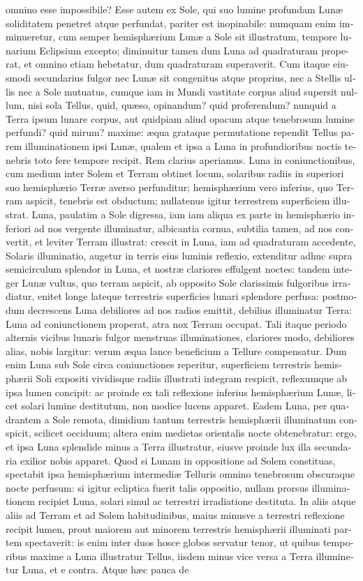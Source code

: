 \documentclass[11pt,twoside,openany]{book}
\begin{document}
\begin{otherlanguage}{latin}
omnino esse impossibile? Esse autem ex Sole, qui suo lumine profundam Lunæ soliditatem penetret atque perfundat, pariter est inopinabile: numquam enim imminueretur, cum semper hemisphærium Lunæ a Sole sit illustratum, tempore lunarium Eclipsium excepto; diminuitur tamen dum Luna ad quadraturam properat, et omnino etiam hebetatur, dum quadraturam superaverit. Cum itaque eiusmodi secundarius fulgor nec Lunæ sit congenitus atque proprius, nec a Stellis ullis nec a Sole mutuatus, cumque iam in Mundi vastitate corpus aliud supersit nullum, nisi sola Tellus, quid, quæso, opinandum? quid proferendum? nunquid a Terra ipsum lunare corpus, aut quidpiam aliud opacum atque tenebrosum lumine perfundi? quid mirum? maxime: æqua grataque permutatione rependit Tellus parem illuminationem ipsi Lunæ, qualem et ipsa a Luna in profundioribus noctis tenebris toto fere tempore recipit. Rem clarius aperiamus. Luna in coniunctionibus, cum medium inter Solem et Terram obtinet locum, solaribus radiis in superiori suo hemisphærio Terræ averso perfunditur; hemisphærium vero inferius, quo Terram aspicit, tenebris est obductum; nullatenus igitur terrestrem superficiem illustrat. Luna, paulatim a Sole digressa, iam iam aliqua ex parte in hemisphærio inferiori ad nos vergente illuminatur, albicantia cornua, subtilia tamen, ad nos convertit, et leviter Terram illustrat: crescit in Luna, iam ad quadraturam accedente, Solaris illuminatio, augetur in terris eius luminis reflexio, extenditur adhuc supra semicirculum splendor in Luna, et nostræ clariores effulgent noctes: tandem integer Lunæ vultus, quo terram aspicit, ab opposito Sole clarissimis fulgoribus irradiatur, enitet longe lateque terrestris superficies lunari splendore perfusa: postmodum decrescens Luna debiliores ad nos radios emittit, debilius illuminatur Terra: Luna ad coniunctionem properat, atra nox Terram occupat. Tali itaque periodo alternis vicibus lunaris fulgor menstruas illuminationes, clariores modo, debiliores alias, nobis largitur: verum æqua lance beneficium a Tellure compensatur. Dum enim Luna sub Sole circa coniunctiones reperitur, superficiem terrestris hemisphærii Soli expositi vividisque radiis illustrati integram respicit, reflexumque ab ipsa lumen concipit: ac proinde ex tali reflexione inferius hemisphærium Lunæ, licet solari lumine destitutum, non modice lucens apparet. Eadem Luna, per quadrantem a Sole remota, dimidium tantum terrestris hemisphærii illuminatum conspicit, scilicet occiduum; altera enim medietas orientalis nocte obtenebratur: ergo, et ipsa Luna splendide minus a Terra illustratur, eiusve proinde lux illa secundaria exilior nobis apparet. Quod si Lunam in oppositione ad Solem constituas, spectabit ipsa hemisphærium intermediæ Telluris omnino tenebrosum obscuraque nocte perfusum: si igitur ecliptica fuerit talis oppositio, nullam prorsus illuminationem recipiet Luna, solari simul ac terrestri irradiatione destituta. In aliis atque aliis ad Terram et ad Solem habitudinibus, maius minusve a terrestri reflexione recipit lumen, prout maiorem aut minorem terrestris hemisphærii illuminati partem spectaverit: is enim inter duos hosce globos servatur tenor, ut quibus temporibus maxime a Luna illustratur Tellus, iisdem minus vice versa a Terra illuminetur Luna, et e contra. Atque hæc pauca de 
\end{otherlanguage}
\end{document}
